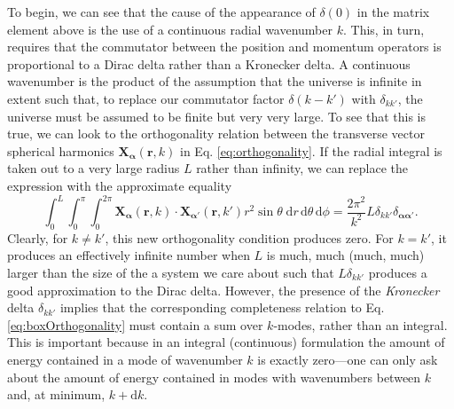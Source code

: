 \documentclass{article}
\numberwithin{equation}{section}
\begin{document}
To begin, we can see that the cause of the appearance of $\delta(0)$ in the matrix element above is the use of a continuous radial wavenumber $k$. This, in turn, requires that the commutator between the position and momentum operators is proportional to a Dirac delta rather than a Kronecker delta. A continuous wavenumber is the product of the assumption that the universe is infinite in extent such that, to replace our commutator factor $\delta(k - k')$ with $\delta_{kk'}$, the universe must be assumed to be finite but very very large. To see that this is true, we can look to the orthogonality relation between the transverse vector spherical harmonics $\mathbf{X}_{\bm{\alpha}}(\mathbf{r},k)$ in Eq. \eqref{eq:orthogonality}. If the radial integral is taken out to a very large radius $L$ rather than infinity, we can replace the expression with the approximate equality
\begin{equation}\label{eq:boxOrthogonality}
\int_0^L\int_0^\pi\int_0^{2\pi}\mathbf{X}_{\bm{\alpha}}(\mathbf{r},k)\cdot\mathbf{X}_{\bm{\alpha}'}(\mathbf{r},k')r^2\sin\theta\;\mathrm{d}r\,\mathrm{d}\theta\,\mathrm{d}\phi  = \frac{2\pi^2}{k^2}L\delta_{kk'}\delta_{\bm{\alpha}\bm{\alpha}'}.
\end{equation}
Clearly, for $k\neq k'$, this new orthogonality condition produces zero. For $k = k'$, it produces an effectively infinite number when $L$ is much, much (much, much) larger than the size of the a system we care about such that $L\delta_{kk'}$ produces a good approximation to the Dirac delta. However, the presence of the \textit{Kronecker} delta $\delta_{kk'}$ implies that the corresponding completeness relation to Eq. \eqref{eq:boxOrthogonality} must contain a sum over $k$-modes, rather than an integral. This is important because in an integral (continuous) formulation the amount of energy contained in a mode of wavenumber $k$ is exactly zero---one can only ask about the amount of energy contained in modes with wavenumbers between $k$ and, at minimum, $k + \mathrm{d}k$.
\end{document}
